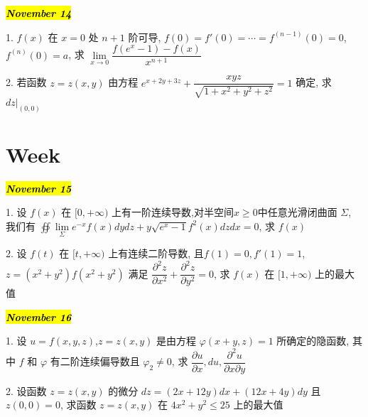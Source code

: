 \hl{\textbf{\textit{November 14}}}

1. $f(x)$ 在 $x=0$ 处 $n+1$ 阶可导, $f(0)=f'(0)=\cdots=f^{(n-1)}(0)=0$,$f^{(n)}(0)=a$,
求 $\lim\limits_{x\rightarrow 0}\dfrac{f(e^{x}-1)-f(x)}{x^{n+1}}$
\begin{solution}
	
\end{solution}

2. 若函数 $z=z(x,y)$ 由方程 $\displaystyle{e^{x+2y+3z}+\dfrac{xyz}{\sqrt{1+x^2+y^2+z^2}}=1}$ 确定, 求 $dz|_{(0,0)}$
\begin{solution}
	
\end{solution}

\section{Week }
\hl{\textbf{\textit{November 15}}}

1. 设 $f(x)$ 在 $[0,+\infty)$ 上有一阶连续导数,对半空间$x\geq 0$中任意光滑闭曲面 $\varSigma$, 
我们有 $\oiint\lim\limits_{\varSigma}e^{-x}f(x)dydz+y\sqrt{e^{x}-1}f^{2}(x)dzdx=0$, 求 $f(x)$
\begin{solution}
	
\end{solution}

2. 设 $f(t)$ 在 $[t,+\infty)$ 上有连续二阶导数, 且$f(1)=0,f'(1)=1$,$z=(x^2+y^2)f(x^2+y^2)$ 
满足 $\dfrac{\partial^2 z}{\partial x^2}+\dfrac{\partial^2 z}{\partial y^2}=0$, 求 $f(x)$ 
在 $[1,+\infty)$ 上的最大值
\begin{solution}
	
\end{solution}

\hl{\textbf{\textit{November 16}}}

1. 设 $u=f(x,y,z)$,$z=z(x,y)$ 是由方程 $\varphi(x+y,z)=1$ 所确定的隐函数,
其中 $f$ 和 $\varphi$ 有二阶连续偏导数且 $\varphi_{2}\neq 0$,
求 $\dfrac{\partial u}{\partial x},du,\dfrac{\partial^2 u}{\partial x\partial y}$
\begin{solution}
	
\end{solution}

2. 设函数 $z=z(x,y)$ 的微分 $dz=(2x+12y)dx+(12x+4y)dy$ 且 $z(0,0)=0$,
求函数 $z=z(x,y)$ 在 $4x^2+y^2\leq 25$ 上的最大值
\begin{solution}
	
\end{solution}

